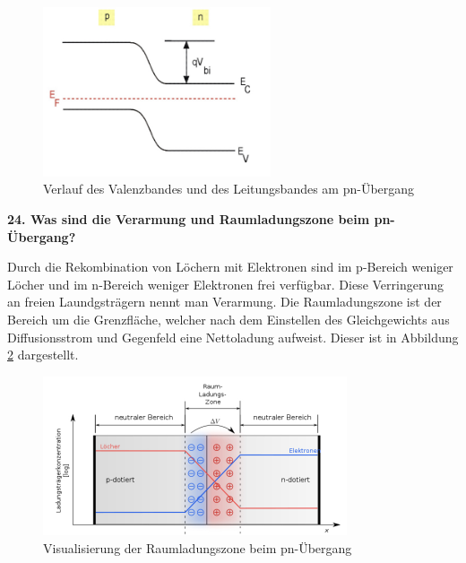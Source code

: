 \begin{addmargin}[25pt]{0pt}
\begin{figure}[h]
    \centering
    \includegraphics[width = 0.6\textwidth]{images/KM2/pn_transition_bandverlauf.jpeg}
    \caption{Verlauf des Valenzbandes und des Leitungsbandes am pn-Übergang}
    \label{fig:pn_transition_bandverlauf}
\end{figure}
\end{addmargin}
\newpage
\noindent\textbf{24. Was sind die Verarmung und Raumladungszone beim pn-Übergang?}\\
\begin{addmargin}[25pt]{0pt}
Durch die Rekombination von Löchern mit Elektronen sind im p-Bereich weniger Löcher und im n-Bereich weniger Elektronen frei verfügbar. Diese Verringerung an freien Laundgsträgern nennt man Verarmung. Die Raumladungszone ist der Bereich um die Grenzfläche, welcher nach dem Einstellen des Gleichgewichts aus Diffusionsstrom und Gegenfeld eine Nettoladung aufweist. Dieser ist in Abbildung \ref{fig:pn_transition_Raumladung} dargestellt. \\

\begin{figure}[h]
    \centering
    \includegraphics[width = 0.8\textwidth]{images/KM2/pn_transition_Raumladungszone.jpeg}
    \caption{Visualisierung der Raumladungszone beim pn-Übergang}
    \label{fig:pn_transition_Raumladung}
\end{figure}
\end{addmargin}

